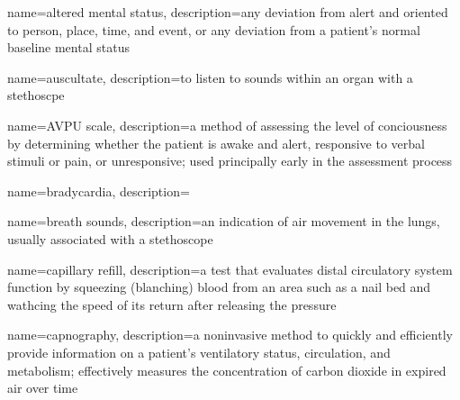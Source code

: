\documentclass[../../EMT-169.tex]{subfiles}
\begin{document}
\setcounter{chapter}{8}
\label{ch:chapter9}
\clearpage



	{
		name=altered mental status,
		description={any deviation from alert and oriented to person, place, time, and event, or any deviation from a patient's normal baseline mental status}
	}

	{
		name=auscultate,
		description={to listen to sounds within an organ with a stethoscpe}
	}

	{
		name=\acrshort{AVPU} scale,
		description={a method of assessing the level of conciousness by determining whether the patient is awake and alert, responsive to verbal stimuli or pain, or unresponsive; used principally early in the assessment process}
	}

	
	{
		name=bradycardia,
		description={ }
	}

	{
		name=breath sounds,
		description={an indication of air movement in the lungs, usually associated with a stethoscope}
	}

	{
		name=capillary refill,
		description={a test that evaluates distal circulatory system function by squeezing (blanching) blood from an area such as a nail bed and wathcing the speed of its return after releasing the pressure}
	}

	{
		name=capnography,
		description={a noninvasive method to quickly and efficiently provide information on a patient's ventilatory status, circulation, and metabolism; effectively measures the concentration of carbon dioxide in expired air over time}
	}
\end{document}
